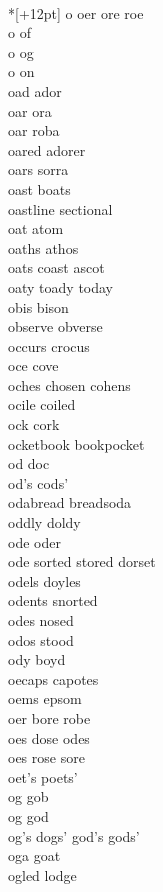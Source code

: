 \vspace{14pt}
\noindent\notextbf{\LargeO}\\*[+12pt]
o oer ore roe  \\
o of \\
o og \\
o on \\
oad ador \\
oar ora\\
oar roba \\
oared adorer \\
oars sorra \\
oast boats \\
oastline sectional \\
oat atom \\
oaths athos\\
oats coast ascot \\
oaty toady today \\
obis bison \\
observe obverse\\
occurs crocus\\
oce cove \\
oches chosen cohens \\
ocile coiled \\
ock cork \\
ocketbook bookpocket \\
od doc \\
od's cods' \\
odabread breadsoda \\
oddly doldy\\
ode oder \\
ode sorted stored dorset   \\
odels doyles \\
odents snorted \\
odes nosed \\
odos stood \\
ody boyd \\
oecaps capotes \\
oems epsom \\
oer bore robe \\
oes dose odes \\
oes rose sore \\
oet's poets' \\
og gob \\
og god \\
og's dogs' god's gods' \\
oga goat \\
ogled lodge\\
